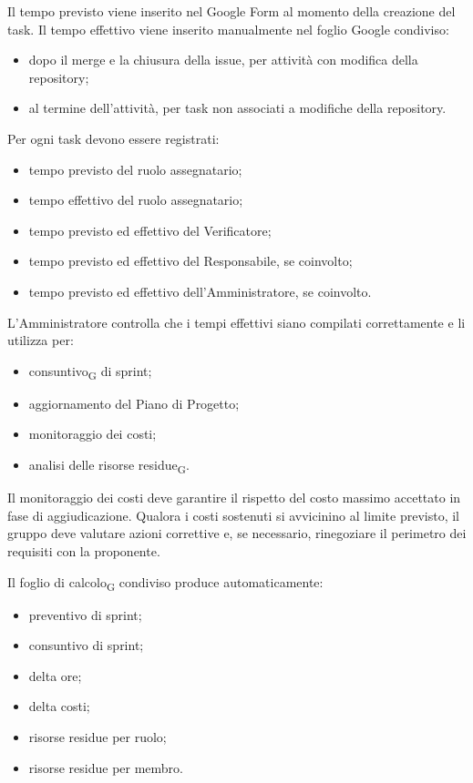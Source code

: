 Il tempo previsto viene inserito nel Google Form al momento della creazione del
task. Il tempo effettivo viene inserito manualmente nel foglio Google condiviso:

\begin{itemize}
    \item dopo il merge e la chiusura della issue, per attività con modifica della
    repository;
    \item al termine dell'attività, per task non associati a modifiche della repository.
\end{itemize}

Per ogni task devono essere registrati:

\begin{itemize}
    \item tempo previsto del ruolo assegnatario;
    \item tempo effettivo del ruolo assegnatario;
    \item tempo previsto ed effettivo del Verificatore;
    \item tempo previsto ed effettivo del Responsabile, se coinvolto;
    \item tempo previsto ed effettivo dell'Amministratore, se coinvolto.
\end{itemize}

L'Amministratore controlla che i tempi effettivi siano compilati correttamente e
li utilizza per:

\begin{itemize}
    \item consuntivo\textsubscript{G} di sprint;
    \item aggiornamento del Piano di Progetto;
    \item monitoraggio dei costi;
    \item analisi delle risorse residue\textsubscript{G}.
\end{itemize}

Il monitoraggio dei costi deve garantire il rispetto del costo massimo accettato
in fase di aggiudicazione. Qualora i costi sostenuti si avvicinino al limite
previsto, il gruppo deve valutare azioni correttive e, se necessario, rinegoziare
il perimetro dei requisiti con la proponente.

Il foglio di calcolo\textsubscript{G} condiviso produce automaticamente:

\begin{itemize}
    \item preventivo di sprint;
    \item consuntivo di sprint;
    \item delta ore;
    \item delta costi;
    \item risorse residue per ruolo;
    \item risorse residue per membro.
\end{itemize}

